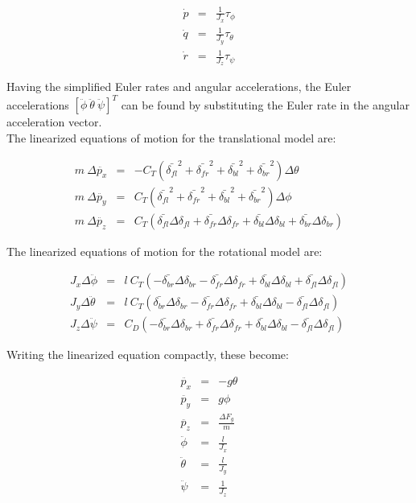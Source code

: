 \begin{eqnarray}{}
	\dot{p} &= & \frac{1}{J_x}\tau_\phi\\
	\dot{q} &= & \frac{1}{J_y}\tau_\theta \\
	\dot{r} &= & \frac{1}{J_z}\tau_\psi 
\end{eqnarray}

Having the simplified Euler rates and angular accelerations, the Euler accelerations $[\ddot{\phi}\ \ddot{\theta}\ \ddot{\psi}]^T$ can be found by substituting the Euler rate in the angular acceleration vector.\\

The linearized equations of motion for the translational model are:

\begin{eqnarray}{}
	m\ \Delta \ddot{p_x} &= & -C_T(\bar{\delta_{fl}}^2 + \bar{\delta_{fr}}^2 + \bar{\delta_{bl}}^2 + \bar{\delta_{br}}^2)\Delta\theta\\
	m\ \Delta \ddot{p_y} &= & C_T(\bar{\delta_{fl}}^2 + \bar{\delta_{fr}}^2 + \bar{\delta_{bl}}^2 + \bar{\delta_{br}}^2)\Delta\phi \\
	m\ \Delta \ddot{p_z} &= & C_T(\bar{\delta_{fl}}\Delta\delta_{fl} + \bar{\delta_{fr}}\Delta\delta_{fr} + \bar{\delta_{bl}}\Delta\delta_{bl} + \bar{\delta_{br}}\Delta\delta_{br}) 
\end{eqnarray}


The linearized equations of motion for the rotational model are:

\begin{eqnarray}{}
	J_x\Delta\ddot{\phi} &= & l \ C_T(-\bar{\delta_{br}}\Delta\delta_{br} - \bar{\delta_{fr}}\Delta\delta_{fr} + \bar{\delta_{bl}}\Delta\delta_{bl} + \bar{\delta_{fl}}\Delta\delta_{fl})\\
	J_y\Delta\ddot{\theta} &= & l \ C_T(\bar{\delta_{br}}\Delta\delta_{br} - \bar{\delta_{fr}}\Delta\delta_{fr} + \bar{\delta_{bl}}\Delta\delta_{bl} - \bar{\delta_{fl}}\Delta\delta_{fl}) \\
	J_z\Delta\ddot{\psi} &= & C_D(-\bar{\delta_{br}}\Delta\delta_{br} + \bar{\delta_{fr}}\Delta\delta_{fr} + \bar{\delta_{bl}}\Delta\delta_{bl} - \bar{\delta_{fl}}\Delta\delta_{fl})
\end{eqnarray}

Writing the linearized equation compactly, these become:

\begin{eqnarray}{}
	\ddot{p_x} &= & -g\theta\\
	\ddot{p_y} &= & g\phi \\
	\ddot{p_z} &= & \frac{\Delta F_g}{m}\\
	\ddot{\phi} &= & \frac{l}{J_x}\\
	\ddot{\theta} &= & \frac{l}{J_y} \\
	\ddot{\psi} &= & \frac{1}{J_z}
\end{eqnarray}


